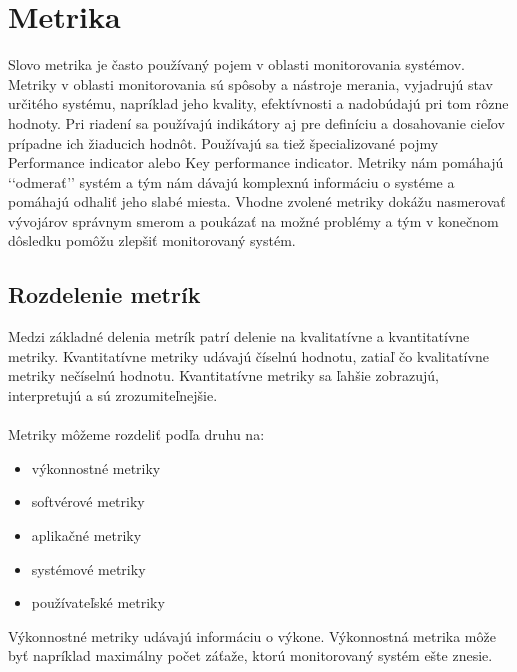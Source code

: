 \documentclass[a4paper, upjsfrontpage, disablespecwarning, thesismargins, thesislinespacing]{rnthesis}
\begin{document}
\section{Metrika}

Slovo metrika je často používaný pojem v oblasti monitorovania systémov.
Metri\-ky v oblasti monitorovania sú spôsoby a nástroje merania, vyjadrujú stav určitého systému, 
napríklad jeho kvality, efektívnosti a nadobúdajú pri tom rôzne hodnoty. 
Pri riadení sa používajú indikátory aj pre definíciu a dosahovanie cieľov prípadne ich žiaducich hodnôt. 
Používajú sa tiež špecializované pojmy Performance indicator alebo Key performance indicator.
\cite{3}
Metriky nám pomáhajú ‘‘odmerať’’ systém a tým nám dávajú komplexnú informáciu o systéme a pomáhajú odhaliť jeho slabé miesta.
Vhodne zvolené metriky dokážu nasmerovať vývojárov správnym smerom a poukázať na možné problémy a tým v konečnom dôsledku pomôžu zlepšiť monitorovaný systém.

\subsection{Rozdelenie metrík}

Medzi základné delenia metrík patrí delenie na kvalitatívne a kvantitatívne metriky.
Kvantitatívne metriky udávajú číselnú hodnotu, zatiaľ čo kvalitatívne metriky nečíselnú hodnotu.  
Kvantitatívne metriky sa ľahšie zobrazujú, interpretujú a sú zrozumiteľnejšie.
~\\
~\\
Metriky môžeme rozdeliť podľa druhu na:

\begin{itemize}
	\item výkonnostné metriky
	\item softvérové metriky
	\item aplikačné metriky
	\item systémové metriky
	\item používateľské metriky
\end{itemize}

Výkonnostné metriky udávajú informáciu o výkone.
Výkonnostná metrika môže byť napríklad maximálny počet záťaže, ktorú monitorovaný systém ešte znesie.
\end{document}
